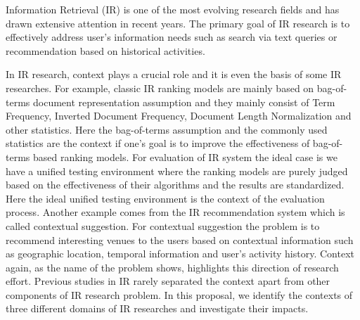 %
%
Information Retrieval (IR) is one of the most evolving research fields 
and has drawn extensive attention in recent years. 
The primary goal of IR research is to effectively address user's 
information needs such as search via text queries or recommendation 
based on historical activities. 

In IR research, context plays a crucial role and it is even the basis 
of some IR researches.
For example, classic IR ranking models are mainly based on 
bag-of-terms document representation assumption and they mainly 
consist of Term Frequency, Inverted Document Frequency, Document Length 
Normalization and other statistics. Here the bag-of-terms assumption 
and the commonly used statistics are the context if one's goal is to 
improve the effectiveness of bag-of-terms based ranking models. 
For evaluation of IR system the ideal case is we have a unified testing 
environment where the ranking models are purely judged based on 
the effectiveness of their algorithms and the results are standardized. 
Here the ideal unified testing environment is the context of the 
evaluation process. 
Another example comes from the IR recommendation system which is called 
contextual suggestion. For contextual suggestion the problem is to recommend 
interesting venues to the users based on contextual information such as 
geographic location, temporal information and user's activity history. 
Context again, as the name of the problem shows, highlights this direction 
of research effort. 
Previous studies in IR rarely separated the context apart from other 
components of IR research problem. 
In this proposal, we identify the contexts of three different domains 
of IR researches and investigate their impacts. 

